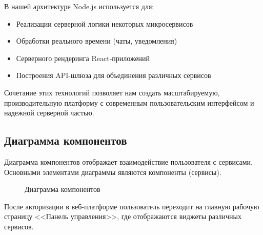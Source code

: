 В нашей архитектуре Node.js используется для:
\begin{itemize}
\item Реализации серверной логики некоторых микросервисов
\item Обработки реального времени (чаты, уведомления)
\item Серверного рендеринга React-приложений
\item Построения API-шлюза для объединения различных сервисов
\end{itemize}

Сочетание этих технологий позволяет нам создать масштабируемую, производительную платформу с современным пользовательским интерфейсом и надежной серверной частью.

\subsection{Диаграмма компонентов}

Диаграмма компонентов отображает взаимодействие пользователя с сервисами. Основными элементами диаграммы являются компоненты (сервисы).

\begin{figure}[H]
\caption{Диаграмма компонентов}
\label{comp:image}
\end{figure}

После авторизации в веб-платформе пользователь переходит на главную рабочую страницу <<Панель управления>>, где отображаются виджеты различных сервисов.

